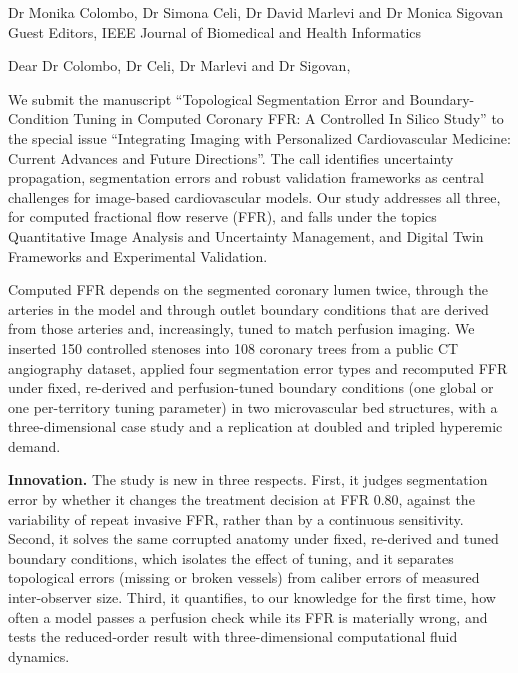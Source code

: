 \documentclass[10pt]{letter}
\date{\today}
\begin{document}
\begin{letter}{Dr Monika Colombo, Dr Simona Celi, Dr David Marlevi and Dr Monica Sigovan\\Guest Editors, IEEE Journal of Biomedical and Health Informatics}
\opening{Dear Dr Colombo, Dr Celi, Dr Marlevi and Dr Sigovan,}

We submit the manuscript ``Topological Segmentation Error and Boundary-Condition Tuning in Computed Coronary FFR: A
Controlled In Silico Study'' to the special issue ``Integrating Imaging with Personalized
Cardiovascular Medicine: Current Advances and Future Directions''. The call identifies uncertainty propagation,
segmentation errors and robust validation frameworks as central challenges for image-based cardiovascular models. Our
study addresses all three, for computed fractional flow reserve (FFR), and falls under the topics Quantitative Image
Analysis and Uncertainty Management, and Digital Twin Frameworks and Experimental Validation.

Computed FFR depends on the segmented coronary lumen twice, through the arteries in the model and through outlet boundary conditions that are derived from those arteries and, increasingly, tuned to match perfusion imaging. We
inserted 150 controlled stenoses into 108 coronary trees from a public CT angiography dataset, applied four segmentation
error types and recomputed FFR under fixed, re-derived and perfusion-tuned boundary conditions (one global or one
per-territory tuning parameter) in two microvascular bed structures, with a three-dimensional case study and a
replication at doubled and tripled hyperemic demand.

\textbf{Innovation.} The study is new in three respects. First, it judges segmentation error by whether it changes
the treatment decision at FFR 0.80, against the variability of repeat invasive FFR, rather than by a continuous
sensitivity. Second, it solves the same corrupted anatomy under fixed, re-derived and tuned boundary conditions,
which isolates the effect of tuning, and it separates topological errors (missing or broken vessels) from caliber
errors of measured inter-observer size. Third, it quantifies, to our knowledge for the first time, how often a model
passes a perfusion check while its FFR is materially wrong, and tests the reduced-order result with
three-dimensional computational fluid dynamics.


\end{letter}
\end{document}
